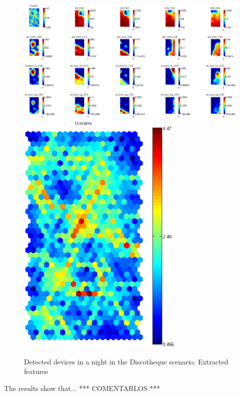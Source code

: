 \documentclass[preprint]{elsarticle}
\begin{document}
\begin{figure}[ht]
	\begin{center}
		\includegraphics[width=14cm]{imgs/DISCO/som_disco_sin_no_detec.eps}
		\includegraphics[width=8cm]{imgs/DISCO/umatrix_disco_sin_no_detec.eps}
		\caption{Detected devices in a night in the Discotheque scenario. Extracted features}
		\label{fig:som_disco_sin_no_detec}
	\end{center}
\end{figure}


The results show that... *** COMENTARLOS ***


\end{document}
